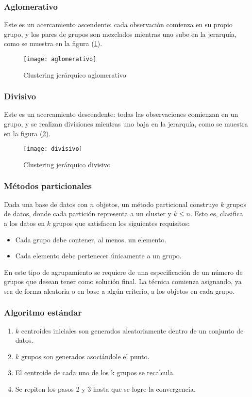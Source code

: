 \documentclass[
]{article}
\begin{document}
\subsubsection{Aglomerativo}
Este es un acercamiento ascendente: cada observación comienza en su propio grupo, y los pares de grupos son mezclados mientras uno sube en la jerarquía, como se muestra en la figura (\ref{fig:alglomerativo}).

\begin{figure}[h]
  \centering
    \texttt{[image: aglomerativo]}
  \caption{Clustering jerárquico aglomerativo}
  \label{fig:alglomerativo}
\end{figure}


\subsubsection{Divisivo}
Este es un acercamiento descendente: todas las observaciones comienzan en un grupo, y se realizan divisiones mientras uno baja en la jerarquía, como se muestra en la figura (\ref{fig:divisivo}).


\begin{figure}[h]
  \centering
    
    \texttt{[image: divisivo]}
  \caption{Clustering jerárquico divisivo}
  \label{fig:divisivo}
\end{figure}



\newpage
\subsubsection{Métodos particionales}
Dada una base de datos con $n$ objetos, un método particional construye $k$ grupos de datos, donde cada partición representa a un cluster y $k \leq n$. Esto es, clasifica a los datos en $k$ grupos que satisfacen los siguientes requisitos:
\begin{itemize}
	\item Cada grupo debe contener, al menos, un elemento.
	\item Cada elemento debe pertenecer únicamente a un grupo.
\end{itemize}
En este tipo de agrupamiento se requiere de una especificación de un número de grupos que desean tener como solución final. La técnica comienza asignando, ya sea de forma aleatoria o en base a algún criterio, a los objetos en cada grupo.
\subsubsection{Algoritmo estándar}
\begin{enumerate}
\item $k$ centroides iniciales son generados aleatoriamente dentro de un conjunto de datos.
\item $k$ grupos son generados asociándole el punto.
\item El centroide de cada uno de los k grupos se recalcula.
\item Se repiten los pasos 2 y 3 hasta que se logre la convergencia.
\end{enumerate}
\end{document}
